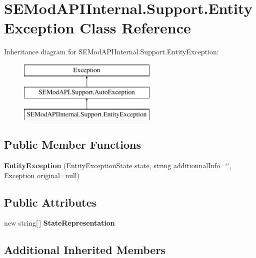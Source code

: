 \hypertarget{class_s_e_mod_a_p_i_internal_1_1_support_1_1_entity_exception}{}\section{S\+E\+Mod\+A\+P\+I\+Internal.\+Support.\+Entity\+Exception Class Reference}
\label{class_s_e_mod_a_p_i_internal_1_1_support_1_1_entity_exception}
Inheritance diagram for S\+E\+Mod\+A\+P\+I\+Internal.\+Support.\+Entity\+Exception\+:\begin{figure}[H]
\begin{center}
\leavevmode
\includegraphics[height=3.000000cm]{class_s_e_mod_a_p_i_internal_1_1_support_1_1_entity_exception}
\end{center}
\end{figure}
\subsection*{Public Member Functions}
\begin{DoxyCompactItemize}
\item 
\hypertarget{class_s_e_mod_a_p_i_internal_1_1_support_1_1_entity_exception_a2a88494727804e14d16076f6f9360414}{}{\bfseries Entity\+Exception} (Entity\+Exception\+State state, string additionnal\+Info=\char`\"{}\char`\"{}, Exception original=null)\label{class_s_e_mod_a_p_i_internal_1_1_support_1_1_entity_exception_a2a88494727804e14d16076f6f9360414}

\end{DoxyCompactItemize}
\subsection*{Public Attributes}
\begin{DoxyCompactItemize}
\item 
new string\mbox{[}$\,$\mbox{]} {\bfseries State\+Representation}
\end{DoxyCompactItemize}
\subsection*{Additional Inherited Members}


